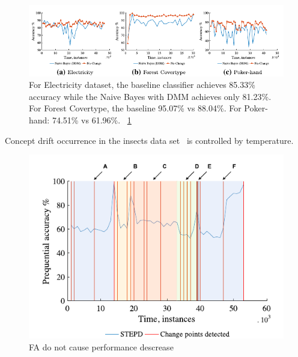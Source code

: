 \documentclass[12 pt]{article}
\begin{document}
  \begin{figure}[htb!]
    \centering
    \includegraphics[height=0.15\textheight]{images_cropped/souza_fig7}
    \caption{
  For Electricity dataset, the baseline classifier achieves 85.33\% accuracy while the Naive Bayes with DMM achieves only 81.23\%. For Forest Covertype, the baseline 95.07\% vs 88.04\%. For Poker-hand: 74.51\% vs 61.96\%.
  ~\ref{fig:fig7_souza}
    }\label{fig:fig7_souza}
  \end{figure}

Concept drift occurrence in the insects data set~\cite{SouzaRMB20} is controlled by temperature.
  \begin{figure}[htb!]
    \centering
    \includegraphics[height=0.4\textheight]{images_cropped/souza_fig28}
    \caption{FA do not cause performance descrease}
    \label{fig:fig28_souza}
  \end{figure}

  \newpage
  
  
\end{document}
